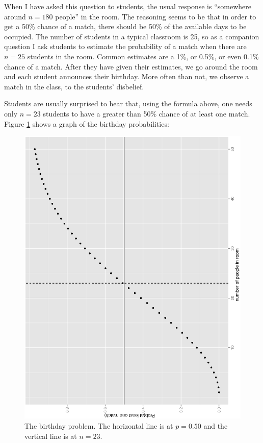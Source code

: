 \documentclass[captions=tableheading]{scrbook}
\begin{document}
\begin{example}
When I have asked this question to students, the usual response is ``somewhere around \(n=180\) people'' in the room. The reasoning seems to be that in order to get a 50\% chance of a match, there should be 50\% of the available days to be occupied. The number of students in a typical classroom is 25, so as a companion question I ask students to estimate the probability of a match when there are \(n=25\) students in the room. Common estimates are a 1\%, or 0.5\%, or even 0.1\% chance of a match. After they have given their estimates, we go around the room and each student announces their birthday. More often than not, we observe a match in the class, to the students' disbelief.

Students are usually surprised to hear that, using the formula above, one needs only \(n=23\) students to have a greater than 50\% chance of at least one match. Figure \ref{fig:birthday} shows a graph of the birthday probabilities:
\end{example}





\begin{figure}[th]
    \includegraphics[angle=270, totalheight=4in]{img/birthday.ps}
    \caption[The birthday problem]{The birthday problem. {\small The horizontal line is at \(p=0.50\) and the vertical line is at \(n=23\).}}
    \label{fig:birthday}
  \end{figure}
\end{document}
